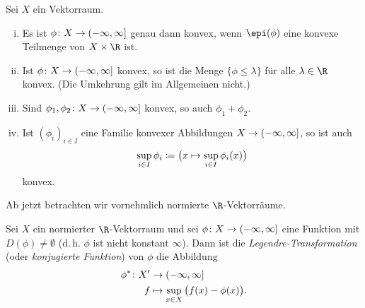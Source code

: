 \pagebreak[2]
\begin{thLemma}
    Sei $X$ ein Vektorraum.
    \begin{enumerate}[i)]
        \item
            Es ist $\phi\colon X\to(-\infty,\infty]$ genau dann konvex, wenn
            $\epi(\phi)$ eine konvexe Teilmenge von $X\times\R$ ist.
        \item
            Ist $\phi\colon X\to(-\infty,\infty]$ konvex, so ist die Menge 
            $\{ \phi\leq\lambda \}$ für alle $\lambda\in\R$ konvex. 
            (Die Umkehrung gilt im Allgemeinen nicht.)
        \item
            Sind $\phi_1,\phi_2\colon X\to(-\infty,\infty]$ konvex, so auch
            $\phi_1+\phi_2$.
        \item
            Ist $(\phi_i)_{i\in I}$ eine Familie konvexer Abbildungen
            $X\to(-\infty,\infty]$, so ist auch 
            \[ \sup_{i\in I} \phi_i 
                \coloneqq \bigl(x\mapsto \sup_{i\in I} \phi_i(x)\bigr)
            \]
            konvex.
    \end{enumerate}
\end{thLemma}

Ab jetzt betrachten wir vornehmlich normierte $\R$-Vektorräume.

\begin{thDef}
    Sei $X$ ein normierter $\R$-Vektorraum und sei 
    $\phi\colon X\to(-\infty,\infty]$ eine Funktion mit $D(\phi)\neq\emptyset$
    (d.\,h. $\phi$ ist nicht konstant $\infty$).
    Dann ist die \emph{Legendre-Transformation} (oder \emph{konjugierte
    Funktion}) von $\phi$ die Abbildung
    \begin{align*}
        \phi^\ast\colon X' &\to (-\infty,\infty]    \\
        f &\mapsto \sup_{x\in X} \, \bigl( f(x) - \phi(x) \bigr)
    . \end{align*}
\end{thDef}

